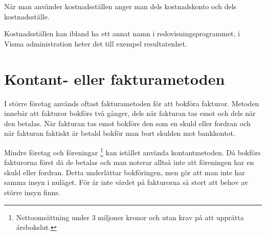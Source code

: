 När man använder kostnadsställen anger man dels kostnadskonto och dels kostnadsställe.

Kostnadsställen kan ibland ha ett annat namn i redovisningsprogrammet, i Visma administration heter det till exempel resultatenhet.

\section{Kontant- eller fakturametoden}
I större företag används oftast fakturametoden för att bokföra fakturor. Metoden innebär att fakturor bokförs två gånger, dels när fakturan tas emot och dels när den betalas. När fakturan tas emot bokförs den som en skuld eller fordran och när fakturan faktiskt är betald bokför man bort skulden mot bankkontot.

Mindre företag och föreningar \footnote{Nettoomsättning under 3 miljoner kronor och utan krav på att upprätta årsbokslut.} kan istället använda kontantmetoden. Då bokförs fakturorna först då de betalas och man noterar alltså inte att föreningen har en skuld eller fordran. Detta underlättar bokföringen, men gör att man inte har samma insyn i nuläget. För  är inte värdet på fakturorna så stort att behov av större insyn finns. 

